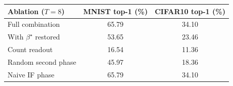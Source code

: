 {\small\begin{tabular}{lcc}\hline
Ablation ($T{=}8$) & MNIST top-1 (\%) & CIFAR10 top-1 (\%) \\\hline
Full combination & 65.79 & 34.10 \\
With $\beta^\star$ restored & 53.65 & 23.46 \\
Count readout & 16.54 & 11.36 \\
Random second phase & 45.97 & 18.36 \\
Naive IF phase & 65.79 & 34.10 \\
\hline\end{tabular}}
